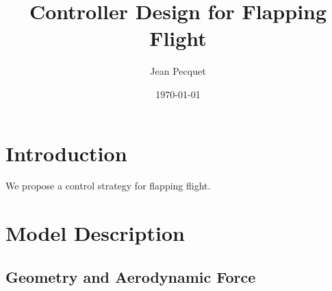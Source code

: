 \documentclass[11pt,letterpaper]{article}
\title{Controller Design for Flapping Flight}
\author{Jean Pecquet}
\date{\today}
\begin{document}
\maketitle
\tableofcontents

\newpage

\section{Introduction}\label{sec:intro}

We propose a control strategy for flapping flight.

\section{Model Description}\label{sec:model}

\subsection{Geometry and Aerodynamic Force}
\end{document}
